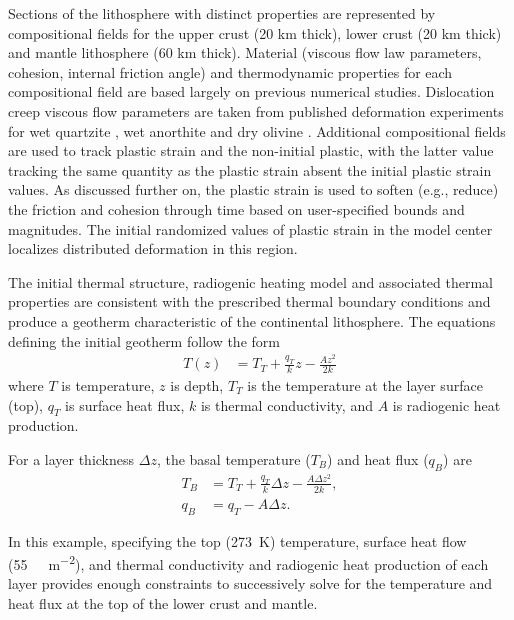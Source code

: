

Sections of the lithosphere with distinct properties are represented by compositional fields for the upper crust (20 km thick), lower crust (20 km thick) and mantle lithosphere (60 km thick). Material (viscous flow law parameters, cohesion, internal friction angle) and thermodynamic properties for each compositional field are based largely on previous numerical studies. Dislocation creep viscous flow parameters are taken from published deformation experiments for wet quartzite \cite{RB04}, wet anorthite \cite{RGWD06} and dry olivine \cite{HK04}. Additional compositional fields are used to track plastic strain and the non-initial plastic, with the latter value tracking the same quantity as the plastic strain absent the initial plastic strain values. As discussed further on, the plastic strain is used to soften (e.g., reduce) the friction and cohesion through time based on user-specified bounds and magnitudes. The initial randomized values of plastic strain in the model center localizes distributed deformation in this region.



The initial thermal structure, radiogenic heating model and associated thermal properties are consistent with the prescribed thermal boundary conditions and produce a geotherm characteristic of the continental lithosphere. The equations defining the initial geotherm \cite{Cha86} follow the form
\begin{align}
  \label{eq:continental-geotherm-1}
  T(z) &= T_T + \frac{q_T}{k}z - \frac{Az^2}{2k}
\end{align}
where $T$ is temperature, $z$ is depth, $T_T$ is the temperature at the layer surface (top), $q_T$ is surface heat flux, $k$ is thermal conductivity, and $A$ is radiogenic heat production.

For a layer thickness $\Delta z$, the basal temperature ($T_B$) and heat flux ($q_B$) are
\begin{align}
  \label{eq:continental-geotherm-2}
  T_B &= T_T + \frac{q_T}{k} \Delta z - \frac{A \Delta z^2}{2k},
  \\
  \label{eq:continental-geotherm-3}
  q_B &= q_T - A \Delta z.
\end{align}

In this example, specifying the top (\SI{273}{K}) temperature, surface heat flow (\SI{55}{\milli\Watt\per\meter^2}), and thermal conductivity and radiogenic heat production of each layer provides enough constraints to successively solve for the temperature and heat flux at the top of the lower crust and mantle.

